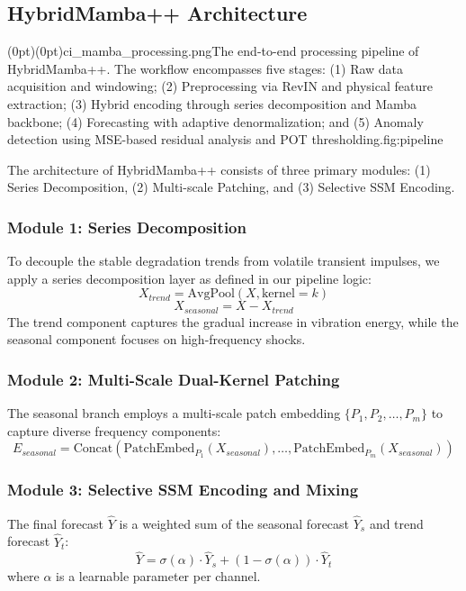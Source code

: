 \documentclass{ieeeaccess}
\begin{document}
{\subsection{HybridMamba++ Architecture}
\label{sec:architecture}

\Figure[t!](0pt)(0pt){ci_mamba_processing.png}{The end-to-end processing pipeline of HybridMamba++. The workflow encompasses five stages: (1) Raw data acquisition and windowing; (2) Preprocessing via RevIN and physical feature extraction; (3) Hybrid encoding through series decomposition and Mamba backbone; (4) Forecasting with adaptive denormalization; and (5) Anomaly detection using MSE-based residual analysis and POT thresholding.}{fig:pipeline}

The architecture of HybridMamba++ consists of three primary modules: (1) Series Decomposition, (2) Multi-scale Patching, and (3) Selective SSM Encoding.

\subsubsection{Module 1: Series Decomposition}
To decouple the stable degradation trends from volatile transient impulses, we apply a series decomposition layer as defined in our pipeline logic:
\begin{equation}
    X_{trend} = \text{AvgPool}(X, \text{kernel}=k)
\end{equation}
\begin{equation}
    X_{seasonal} = X - X_{trend}
\end{equation}
The trend component captures the gradual increase in vibration energy, while the seasonal component focuses on high-frequency shocks.

\subsubsection{Module 2: Multi-Scale Dual-Kernel Patching}
The seasonal branch employs a multi-scale patch embedding $\{P_1, P_2, \dots, P_m\}$ to capture diverse frequency components:
\begin{equation}
    E_{seasonal} = \text{Concat}(\text{PatchEmbed}_{P_1}(X_{seasonal}), \dots, \text{PatchEmbed}_{P_m}(X_{seasonal}))
\end{equation}

\subsubsection{Module 3: Selective SSM Encoding and Mixing}
The final forecast $\hat{Y}$ is a weighted sum of the seasonal forecast $\hat{Y}_s$ and trend forecast $\hat{Y}_t$:
\begin{equation}
    \hat{Y} = \sigma(\alpha) \cdot \hat{Y}_s + (1 - \sigma(\alpha)) \cdot \hat{Y}_t
\end{equation}
where $\alpha$ is a learnable parameter per channel.

}
\end{document}
